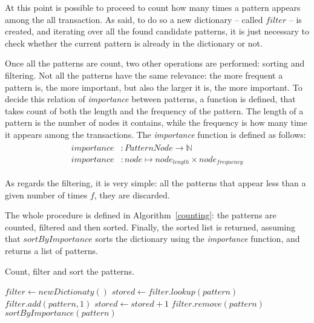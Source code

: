 \documentclass{acm_proc_article-sp-sigmod09}
\begin{document}
At this point is possible to proceed to count how many times a pattern appears among the all transaction. As said, to do so a new dictionary -- called $filter$ -- is created, and iterating over all the found candidate patterns, it is just necessary to check whether the current pattern is already in the dictionary or not.

Once all the patterns are count, two other operations are performed: sorting and filtering. Not all the patterns have the same relevance: the more frequent a pattern is, the more important, but also the larger it is, the more important. To decide this relation of \emph{importance} between patterns, a function is defined, that takes count of both the length and the frequency of the pattern. The length of a pattern is the number of nodes it contains, while the frequency is how many time it appears among the transactions. The \emph{importance} function is defined as follows:
\begin{gather}
\begin{split}
importance & \colon PatternNode \to \mathbb{N} \\
importance & \colon node \mapsto node_{length} \times node_{frequency}
\end{split}
\end{gather}

As regards the filtering, it is very simple: all the patterns that appear less than a given number of times $f$, they are discarded.

The whole procedure is defined in Algorithm~\ref{counting}: the patterns are counted, filtered and then sorted. Finally, the sorted list is returned, assuming that $sortByImportance$ sorts the dictionary using the \emph{importance} function, and returns a list of patterns.

\begin{algorithm}
\caption{Count, filter and sort the patterns.}
\label{counting}
\begin{algorithmic}[1]
\State $filter \gets new Dictionaty()$
	\State $stored \gets filter.lookup(pattern)$
		\State $filter.add(pattern, 1)$
	\Else
		\State $stored \gets stored + 1$
	\EndIf
\EndFor
{}
		\State $filter.remove(pattern)$
	\EndIf
\EndFor
\Return $sortByImportance(pattern)$
\EndFunction
\end{algorithmic}
\end{algorithm}
\end{document}
